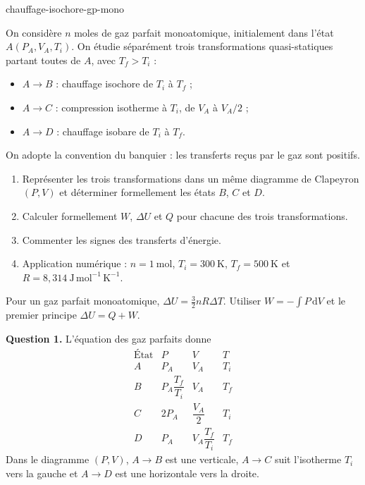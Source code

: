 
\begin{exo}{chauffage-isochore-gp-mono}

On considère $n$ moles de gaz parfait monoatomique, initialement dans l'état
$A(P_A,V_A,T_i)$. On étudie séparément trois transformations quasi-statiques
partant toutes de $A$, avec $T_f>T_i$ :
\begin{itemize}
\item $A\to B$ : chauffage isochore de $T_i$ à $T_f$ ;
\item $A\to C$ : compression isotherme à $T_i$, de $V_A$ à $V_A/2$ ;
\item $A\to D$ : chauffage isobare de $T_i$ à $T_f$.
\end{itemize}

On adopte la convention du banquier : les transferts reçus par le gaz sont
positifs.

\begin{enumerate}
\item Représenter les trois transformations dans un même diagramme de
Clapeyron $(P,V)$ et déterminer formellement les états $B$, $C$ et $D$.
\item Calculer formellement $W$, $\Delta U$ et $Q$ pour chacune des trois
transformations.
\item Commenter les signes des transferts d'énergie.
\item Application numérique : $n=1\ \mathrm{mol}$, $T_i=300\ \mathrm{K}$,
$T_f=500\ \mathrm{K}$ et
$R=8{,}314\ \mathrm{J\,mol^{-1}\,K^{-1}}$.
\end{enumerate}

\begin{indication}
Pour un gaz parfait monoatomique,
$\Delta U=\frac32nR\Delta T$. Utiliser
$W=-\int P\,\mathrm{d}V$ et le premier principe
$\Delta U=Q+W$.
\end{indication}

\begin{solution}
\textbf{Question 1.} L'équation des gaz parfaits donne
\[
\begin{array}{c|c|c|c}
\text{État} & P & V & T \\ \hline
A & P_A & V_A & T_i \\
B & P_A\dfrac{T_f}{T_i} & V_A & T_f \\[4pt]
C & 2P_A & \dfrac{V_A}{2} & T_i \\[4pt]
D & P_A & V_A\dfrac{T_f}{T_i} & T_f
\end{array}
\]
Dans le diagramme $(P,V)$, $A\to B$ est une verticale, $A\to C$ suit
l'isotherme $T_i$ vers la gauche et $A\to D$ est une horizontale vers la
droite.


\end{solution}
\end{exo}
